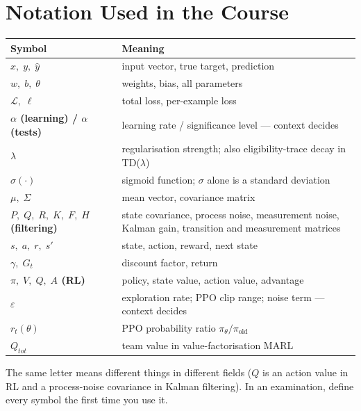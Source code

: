 \documentclass[11pt]{article}
\begin{document}
\section{Notation Used in the Course}
\begin{center}\small\renewcommand{\arraystretch}{1.25}
\begin{tabularx}{\textwidth}{>{\bfseries}l X}\toprule Symbol & Meaning\\\midrule
$x,\;y,\;\hat y$ & input vector, true target, prediction\\
$w,\;b,\;\theta$ & weights, bias, all parameters\\
$\mathcal L,\;\ell$ & total loss, per-example loss\\
$\alpha$ (learning) / $\alpha$ (tests) & learning rate / significance level --- context decides\\
$\lambda$ & regularisation strength; also eligibility-trace decay in TD($\lambda$)\\
$\sigma(\cdot)$ & sigmoid function; $\sigma$ alone is a standard deviation\\
$\mu,\;\Sigma$ & mean vector, covariance matrix\\
$P,\;Q,\;R,\;K,\;F,\;H$ (filtering) & state covariance, process noise, measurement noise, Kalman gain, transition and measurement matrices\\
$s,\;a,\;r,\;s'$ & state, action, reward, next state\\
$\gamma,\;G_t$ & discount factor, return\\
$\pi,\;V,\;Q,\;A$ (RL) & policy, state value, action value, advantage\\
$\varepsilon$ & exploration rate; PPO clip range; noise term --- context decides\\
$r_t(\theta)$ & PPO probability ratio $\pi_\theta/\pi_{\text{old}}$\\
$Q_{tot}$ & team value in value-factorisation MARL\\\bottomrule
\end{tabularx}\end{center}
The same letter means different things in different fields ($Q$ is an action value in RL and a process-noise covariance in Kalman filtering). In an examination, define every symbol the first time you use it.
\end{document}
